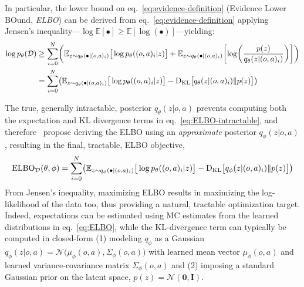 In particular, the lower bound on eq.~\ref{eq:evidence-definition} (Evidence Lower BOund, \emph{ELBO}) can be derived from eq.~\ref{eq:evidence-definition} applying Jensen's inequality---\(\log \mathbb{E}[\bullet] \geq \mathbb{E} [\log (\bullet)] \)---yielding:
\begin{align}
    \log p_\theta(\mathcal D) &\geq \sum_{i=0}^{N} \left(
            \mathbb{E}_{z \sim q_\theta(\bullet \vert (o,a)_i)} \big[ \log p_\theta((o,a)_i \vert z) \big]
            + \mathbb{E}_{z \sim q_\theta(\bullet \vert (o,a)_i)} \left[ \log \left( \frac{p(z)}{q_\theta(z \vert (o,a)_i)} \right) \right]
        \right) \\
        &= \sum_{i=0}^{N} \left(
            \mathbb{E}_{z \sim q_\theta(\bullet \vert (o,a)_i)} \big[ \log p_\theta((o,a)_i \vert z) \big]
        - \DKL \big[ q_\theta(z \vert (o,a)_i) \Vert p(z) \big]
        \right) \label{eq:ELBO-intractable}
\end{align}

The true, generally intractable, posterior \( q_\theta (z \vert o,a) \) prevents computing both the expectation and KL divergence terms in eq.~\ref{eq:ELBO-intractable}, and therefore~\citet{kingma2013auto} propose deriving the ELBO using an \emph{approximate} posterior \( q_\phi(z \vert o,a) \), resulting in the final, tractable, ELBO objective,
\begin{align}
\text{ELBO}_{\mathcal D}(\theta, \phi) = \sum_{i=0}^{N} \left(
            \mathbb{E}_{z \sim q_\phi(\bullet \vert (o,a)_i)} \big[ \log p_\theta((o,a)_i \vert z) \big]
        - \DKL \big[ q_\phi(z \vert (o,a)_i) \Vert p(z) \big]
        \right)
        \label{eq:ELBO}
\end{align}
From Jensen's inequality, maximizing ELBO results in maximizing the log-likelihood of the data too, thus providing a natural, tractable optimization target.
Indeed, expectations can be estimated using MC estimates from the learned distributions in eq.~\ref{eq:ELBO}, while the KL-divergence term can typically be computed in closed-form (1) modeling  \(q_\phi \) as a Gaussian \(q_\phi(z \vert o,a) = \mathcal N\big(\mu_\phi(o,a), \Sigma_\phi(o,a) \big) \) with learned mean vector \( \mu_\phi(o,a) \) and learned variance-covariance matrix \( \Sigma_\phi(o,a) \) and (2) imposing a standard Gaussian prior on the latent space, \( p(z) = \mathcal N(\mathbf{0}, \mathbf{I}) \).

